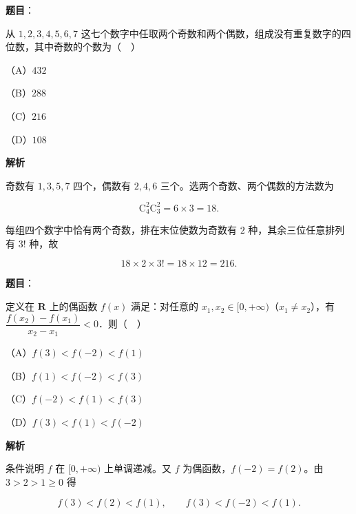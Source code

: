 \begin{answer}

\textbf{题目}：

从 $1,2,3,4,5,6,7$ 这七个数字中任取两个奇数和两个偶数，组成没有重复数字的四位数，其中奇数的个数为（　）

（A）$432$

（B）$288$

（C）$216$

（D）$108$

\textbf{解析}

奇数有 $1,3,5,7$ 四个，偶数有 $2,4,6$ 三个。选两个奇数、两个偶数的方法数为

\nopagebreak[4]
\[\mathrm C_4^2\mathrm C_3^2=6\times3=18.\]

每组四个数字中恰有两个奇数，排在末位使数为奇数有 $2$ 种，其余三位任意排列有 $3!$ 种，故

\nopagebreak[4]
\[18\times2\times3!=18\times12=216.\]


\end{answer}
\begin{answer}

\textbf{题目}：

定义在 $\mathbf R$ 上的偶函数 $f(x)$ 满足：对任意的 $x_1,x_2\in[0,+\infty)$（$x_1\neq x_2$），有 $\dfrac{f(x_2)-f(x_1)}{x_2-x_1}<0$．则（　）

（A）$f(3)<f(-2)<f(1)$

（B）$f(1)<f(-2)<f(3)$

（C）$f(-2)<f(1)<f(3)$

（D）$f(3)<f(1)<f(-2)$

\textbf{解析}

条件说明 $f$ 在 $[0,+\infty)$ 上单调递减。又 $f$ 为偶函数，$f(-2)=f(2)$。由 $3>2>1\geqslant0$ 得

\nopagebreak[4]
\[f(3)<f(2)<f(1),\qquad f(3)<f(-2)<f(1).\]


\end{answer}
